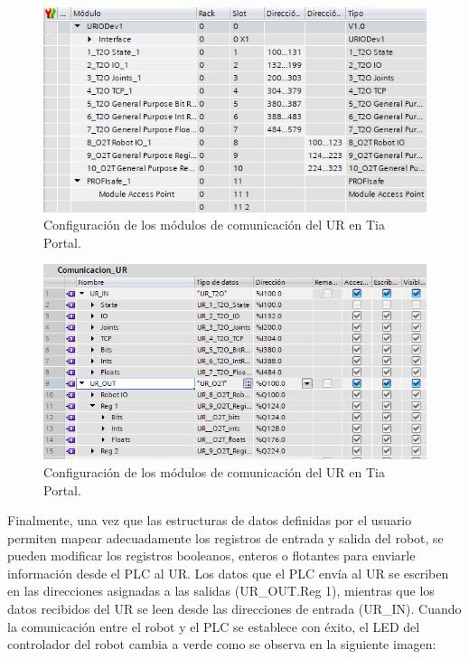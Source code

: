 \begin{figure} [h!]
  \begin{center}
    \includegraphics[width=15cm]{figs/com_ur_modulos}
  \end{center}
  \caption{\centering Configuración de los módulos de comunicación del UR en Tia Portal.}
  \label{fig:com_ur_modulos}
\end{figure} 

\clearpage

\begin{figure} [h!]
  \begin{center}
    \includegraphics[width=13cm]{figs/com_plc_ur}
  \end{center}
  \caption{\centering Configuración de los módulos de comunicación del UR en Tia Portal.}
  \label{fig:com_plc_ur}
\end{figure} 

Finalmente, una vez que las estructuras de datos definidas por el usuario permiten mapear adecuadamente los registros de entrada y salida del robot, se pueden modificar los registros booleanos, enteros o flotantes para enviarle información desde el PLC al UR. Los datos que el PLC envía al UR se escriben en las direcciones asignadas a las salidas (UR\_OUT.Reg 1), mientras que los datos recibidos del UR se leen desde las direcciones de entrada (UR\_IN). Cuando la comunicación entre el robot y el PLC se establece con éxito, el LED del controlador del robot cambia a verde como se observa en la siguiente imagen:

